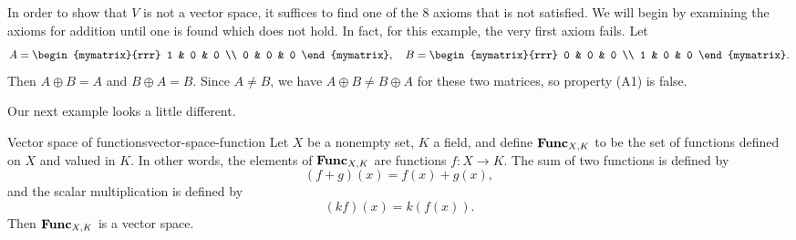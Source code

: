 \begin{solution}
  In order to show that $V$ is not a vector space, it suffices to find
  one of the 8 axioms that is not satisfied. We will begin by examining
  the axioms for addition until one is found which does not hold. In
  fact, for this example, the very first axiom fails. Let
  \begin{equation*}
    A = \begin{mymatrix}{rrr}
      1 & 0 & 0 \\
      0 & 0 & 0
    \end{mymatrix},
    \quad
    B = \begin{mymatrix}{rrr}
      0 & 0 & 0 \\
      1 & 0 & 0
    \end{mymatrix}.
  \end{equation*}
  Then $A\oplus B=A$ and $B\oplus A=B$. Since $A\neq B$, we have
  $A\oplus B\neq B\oplus A$ for these two matrices, so property (A1)
  is false. 
\end{solution}

Our next example looks a little different. 

\begin{example}{Vector space of functions}{vector-space-function}
  Let $X$ be a nonempty set, $K$ a field, and define $\mathbf{Func}_{X,K}$%
   to be the set of functions
   defined on $X$ and valued in
  $K$. In other words, the elements of $\mathbf{Func}_{X,K}$ are functions
  $f:X\to K$. The sum of two functions is defined by
  \begin{equation*}
    (f + g)(x) = f(x) + g(x),
  \end{equation*}
  and the scalar multiplication is defined by
  \begin{equation*}
    (kf) (x) = k(f(x)).
  \end{equation*}
  Then $\mathbf{Func}_{X,K}$ is a vector space.
\end{example}

